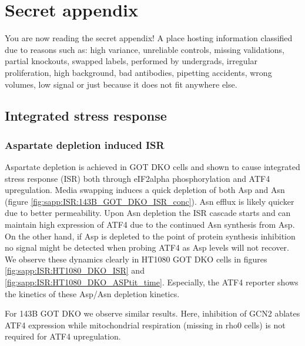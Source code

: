 \chapter{Secret appendix}
You are now reading the secret appendix!
A place hosting information classified due to reasons such as: high variance, unreliable controls, missing validations, partial knockouts, swapped labels, performed by undergrads, irregular proliferation, high background, bad antibodies, pipetting accidents, wrong volumes, low signal or just because it does not fit anywhere else.



\section{Integrated stress response}

\subsection{Aspartate depletion induced ISR}
Aspartate depletion is achieved in GOT DKO cells and shown to cause integrated stress response (ISR) both through eIF2alpha phosphorylation and ATF4 upregulation.
Media swapping induces a quick depletion of both Asp and Asn (figure \ref{fig:sapp:ISR:143B_GOT_DKO_ISR_conc}).
Asn efflux is likely quicker due to better permeability.
Upon Asn depletion the ISR cascade starts and can maintain high expression of ATF4 due to the continued Asn synthesis from Asp.
On the other hand, if Asp is depleted to the point of protein synthesis inhibition no signal might be detected when probing ATF4 as Asp levels will not recover.
We observe these dynamics clearly in HT1080 GOT DKO cells in figures \ref{fig:sapp:ISR:HT1080_DKO_ISR} and \ref{fig:sapp:ISR:HT1080_DKO_ASPtit_time}.
Especially, the ATF4 reporter shows the kinetics of these Asp/Asn depletion kinetics.

For 143B GOT DKO we observe similar results.
Here, inhibition of GCN2 ablates ATF4 expression while mitochondrial respiration (missing in rho0 cells) is not required for ATF4 upregulation.

